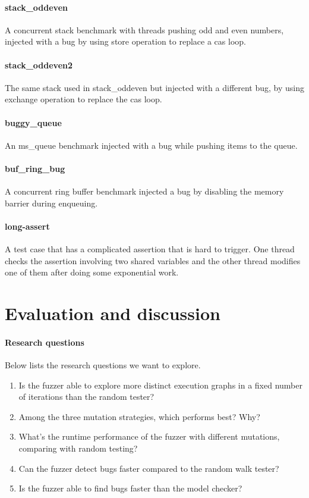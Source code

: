 \paragraph{stack\_oddeven} A concurrent stack benchmark with threads pushing odd and even numbers, injected with a bug by using store operation to replace a cas loop.

\paragraph{stack\_oddeven2} The same stack used in stack\_oddeven but injected with a different bug, by using exchange operation to replace the cas loop. 

\paragraph{buggy\_queue}  An ms\_queue benchmark injected with a bug while pushing items to the queue. 

\paragraph{buf\_ring\_bug} A concurrent ring buffer benchmark injected a bug by disabling the memory barrier during enqueuing.

\paragraph{long-assert} A test case that has a complicated assertion that is hard to trigger. One thread checks the assertion involving two shared variables and the other thread modifies one of them after doing some exponential work.

\section{Evaluation and discussion}

\paragraph*{Research questions} Below lists the research questions we want to explore.

\begin{enumerate}[label=RQ\arabic*,resume]
	\item Is the fuzzer able to explore more distinct execution graphs in a fixed number of iterations than the random tester? \label{RQ:CutVSRandom}
	\item Among the three mutation strategies, which performs best? Why? \label{RQ:CutComparison}
	\item What's the runtime performance of the fuzzer with different mutations, comparing with random testing? \label{RQ:GenMCOverhead}
	\item Can the fuzzer detect bugs faster compared to the random walk tester? \label{RQ:GenmcBug}
	\item Is the fuzzer able to find bugs faster than the model checker?\label{RQ:GenMC_vs_fuzzer}
\end{enumerate}



